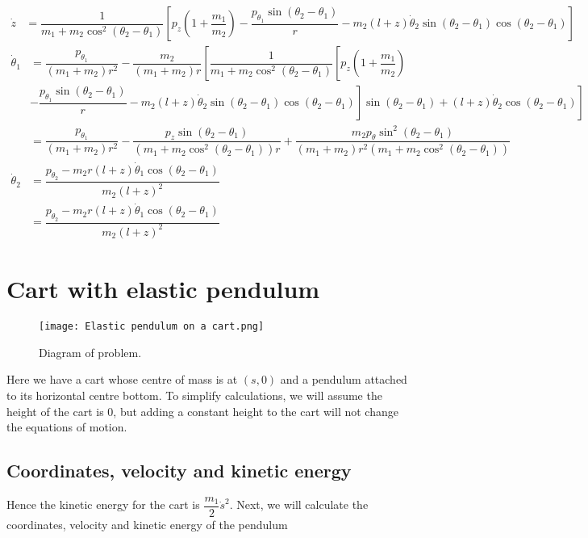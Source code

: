 \documentclass[12pt,a4paper,portrait]{article}
\begin{document}
\begin{landscape}
\begin{align*}
	\dot{z} &= \dfrac{1}{m_1+m_2\cos^2{(\theta_2-\theta_1)}} \left[p_z \left(1+\dfrac{m_1}{m_2}\right)-\dfrac{p_{\theta_1}\sin{(\theta_2-\theta_1)}}{r} - m_2(l+z)\dot{\theta}_2\sin{(\theta_2-\theta_1)}\cos{(\theta_2-\theta_1)} \right]
\end{align*}
\begin{align*}
	\dot{\theta}_1 &= \dfrac{p_{\theta_1}}{(m_1+m_2)r^2} - \dfrac{m_2}{(m_1+m_2)r}\left[\dfrac{1}{m_1+m_2\cos^2{(\theta_2-\theta_1)}} \left[p_z \left(1+\dfrac{m_1}{m_2}\right)\right.\right.\\
	&\left.\left.-\dfrac{p_{\theta_1}\sin{(\theta_2-\theta_1)}}{r} - m_2(l+z)\dot{\theta}_2\sin{(\theta_2-\theta_1)}\cos{(\theta_2-\theta_1)} \right] \sin{(\theta_2-\theta_1)} + (l+z)\dot{\theta}_2\cos{(\theta_2 - \theta_1)}\right]\\
	&= \dfrac{p_{\theta_1}}{(m_1+m_2)r^2} - \dfrac{p_z\sin{(\theta_2-\theta_1)}}{(m_1+m_2\cos^2{(\theta_2-\theta_1)})r} + \dfrac{m_2p_{\theta}\sin^2{(\theta_2-\theta_1)}}{(m_1+m_2)r^2(m_1+m_2\cos^2{(\theta_2-\theta_1)})}\\
	\dot{\theta}_2 &= \dfrac{p_{\theta_2} - m_2r(l+z)\dot{\theta}_1\cos{(\theta_2-\theta_1)}}{m_2(l+z)^2} \\
	&= \dfrac{p_{\theta_2} - m_2r(l+z)\dot{\theta}_1\cos{(\theta_2-\theta_1)}}{m_2(l+z)^2}
\end{align*} 
\end{landscape}

\section{Cart with elastic pendulum}
\begin{figure}[H]
	\texttt{[image: Elastic pendulum on a cart.png]}
	\caption{Diagram of problem.}\label{fig1}
\end{figure}

Here we have a cart whose centre of mass is at $(s, 0)$ and a pendulum attached to its horizontal centre bottom. To simplify calculations, we will assume the height of the cart is 0, but adding a constant height to the cart will not change the equations of motion.

\subsection{Coordinates, velocity and kinetic energy}
Hence the kinetic energy for the cart is $\dfrac{m_1}{2}\dot{s}^2$. Next, we will calculate the coordinates, velocity and kinetic energy of the pendulum
\end{document}
